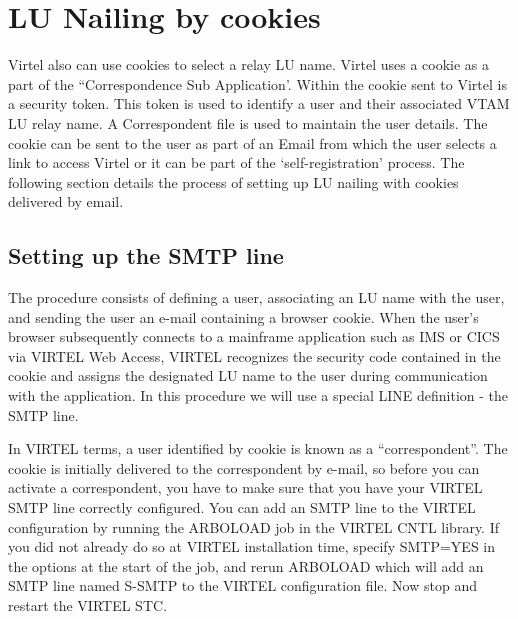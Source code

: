 \documentclass[letterpaper,10pt,english]{sphinxmanual}
\begin{document}
\newpage

\ignorespaces 

\section{LU Nailing by cookies}
\label{\detokenize{connectivity_guide:lu-nailing-by-cookies}}\label{\detokenize{connectivity_guide:index-153}}
Virtel also can use cookies to select a relay LU name. Virtel uses a cookie as a part of the “Correspondence Sub Application’. Within the cookie sent to Virtel is a security token. This token is used to identify a user and their associated VTAM LU relay name. A Correspondent file is used to maintain the user details. The cookie can be sent to the user as part of an Email from which the user selects a link to access Virtel or it can be part of the ‘self-registration’ process. The following section details the process of setting up LU nailing with cookies delivered by email.


\subsection{Setting up the SMTP line}
\label{\detokenize{connectivity_guide:setting-up-the-smtp-line}}
The procedure consists of defining a user, associating an LU name with the user, and sending the user an e-mail containing a browser cookie.  When the user’s browser subsequently connects to a mainframe application such as IMS or CICS via VIRTEL Web Access, VIRTEL recognizes the security code contained in the cookie and assigns the designated LU name to the user during communication with the application. In this procedure we will use a special LINE definition - the SMTP line.

In VIRTEL terms, a user identified by cookie is known as a “correspondent”.  The cookie is initially delivered to the correspondent by e-mail, so before you can activate a correspondent, you have to make sure that you have your VIRTEL SMTP line correctly configured. You can add an SMTP line to the VIRTEL configuration by running the ARBOLOAD job in the VIRTEL CNTL library. If you did not already do so at VIRTEL installation time, specify SMTP=YES in the options at the start of the job, and rerun ARBOLOAD which will add an SMTP line named S-SMTP to the VIRTEL configuration file.  Now stop and restart the VIRTEL STC.
\end{document}
